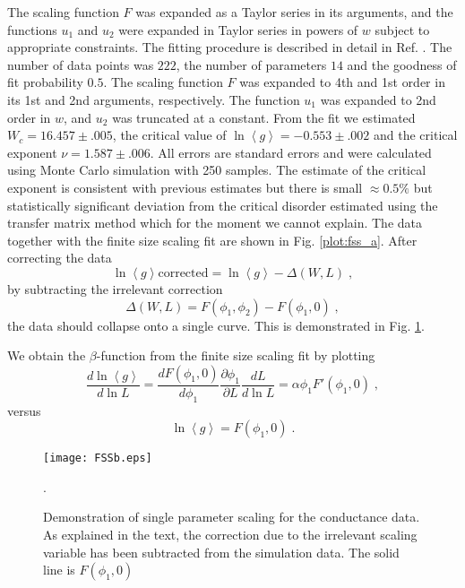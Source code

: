 \documentclass[singlecolumn]{jpsj3}
\begin{document}
The scaling function $F$ was expanded as a Taylor series in its arguments, and the functions $u_1$ and
$u_2$ were expanded in Taylor series in powers of $w$ subject to appropriate constraints.
The fitting procedure is described in detail in Ref. .
The number of data points was $222$, the number of parameters $14$ and the goodness of fit probability $0.5$.
The scaling function $F$ was expanded to 4th and 1st order in its 1st and 2nd arguments, respectively.
The function $u_1$ was expanded to 2nd order in $w$, and $u_2$ was truncated at a constant.
From the fit  we estimated $W_c= 16.457 \pm .005$, the critical value of $\ln\left<g\right> = -0.553 \pm .002$ and the critical exponent $\nu=1.587 \pm .006$.
All errors are standard errors and were calculated using Monte Carlo simulation with 250 samples.
The estimate of the critical exponent is consistent with previous estimates\cite{Slevin14} but there is small
$\approx 0.5 \%$ but statistically significant deviation from the critical disorder estimated using the transfer matrix method
which for the moment we cannot explain.
The data together with the finite size scaling fit are shown in Fig. \ref{plot:fss_a}.
After correcting the data
\begin{equation}
\ln \left< g \right> \mathrm{corrected} = \ln \left< g \right> - \Delta\left(W, L\right) \;,
\end{equation}
by subtracting the irrelevant correction
\begin{equation}
\Delta\left(W, L\right) = F\left( \phi_1, \phi_2 \right) - F\left( \phi_1, 0 \right) \;,
\end{equation}
the data should collapse onto a single curve. This is demonstrated in Fig. \ref{plot:fss_b}.



We obtain the $\beta$-function from the finite size scaling fit by plotting
\begin{equation}
\frac{{d\ln \left\langle g \right\rangle }}{{d\ln L}} = \frac{{dF\left( {{\phi _1},0} \right)}}{{d{\phi _1}}}\frac{{\partial {\phi _1}}}{{\partial L}}\frac{{dL}}{{d\ln L}} = \alpha {\phi _1}F'\left( {{\phi _1},0} \right) \;,
\end{equation}
versus
\begin{equation}
\ln \left\langle g \right\rangle  = F\left( {\phi_1,0} \right) \;.
\end{equation}



\begin{figure}[htb]
\begin{center}
\texttt{[image: FSSb.eps]}
\caption{Demonstration of single parameter scaling for the conductance data. As explained in the text, the correction due to the irrelevant scaling variable has been subtracted from the simulation data. The solid line is $F\left( \phi_1, 0 \right)$}.
\label{plot:fss_b}
\end{center}
\end{figure}
\end{document}
